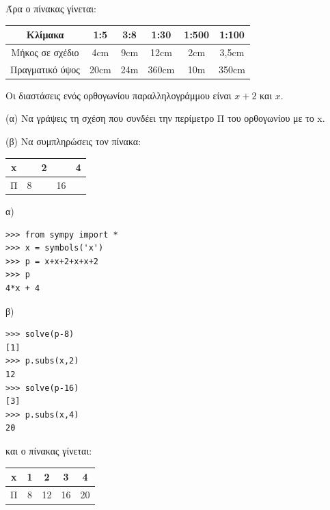 Άρα ο πίνακας γίνεται:
\begin{table}
\begin{tabular}{|c|c|c|c|c|c|}
\hline
Κλίμακα&1:5&3:8&1:30&1:500&1:100\\\hline
Μήκος σε σχέδιο&4cm &9cm&12cm&2cm&3,5cm\\\hline
Πραγματικό ύψος&20cm&24m&360cm&10m&350cm\\\hline
\end{tabular}
\end{table}
\begin{exercise}
Οι διαστάσεις ενός ορθογωνίου παραλληλογράμμου είναι $x+2$ και $x$.

(α) Να γράψεις τη σχέση που συνδέει την περίμετρο Π του ορθογωνίου με το x.

(β) Να συμπληρώσεις τον πίνακα:
\begin{table}
\begin{tabular}{|c|c|c|c|c|}
x&&2&&4\\\hline
Π&8&&16&\\\hline
\end{tabular}
\end{table}
\end{exercise}
α)
\begin{lstlisting}
>>> from sympy import *
>>> x = symbols('x')
>>> p = x+x+2+x+x+2
>>> p
4*x + 4
\end{lstlisting}
β)
\begin{lstlisting}
>>> solve(p-8)
[1]
>>> p.subs(x,2)
12
>>> solve(p-16)
[3]
>>> p.subs(x,4)
20
\end{lstlisting}
και ο πίνακας γίνεται:
\begin{table}
\begin{tabular}{|c|c|c|c|c|}
\hline
x&1 &2  &3  &4\\\hline
Π&8&12&16&20\\\hline
\end{tabular}
\end{table}
